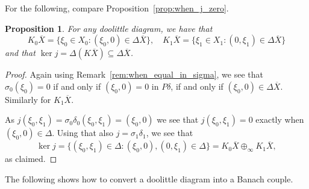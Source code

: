 \documentclass[a4paper,11pt]{article}
\theoremstyle{plain}
\newtheorem{proposition}{Proposition}[section]
\theoremstyle{remark}
\begin{document}
For the following, compare Proposition~\ref{prop:when_j_zero}.

\begin{proposition}\label{prop:Ki_and_j}
For any doolittle diagram, we have that
\[ K_0\overline X = \{ \xi_0\in X_0 : (\xi_0,0) \in \Delta\overline X \}, \quad
K_1\overline X = \{ \xi_1\in X_1 : (0,\xi_1) \in \Delta\overline X \} \]
and that $\ker j = \Delta(K\overline X) \subseteq \Delta\overline X$.
\end{proposition}
\begin{proof}
Again using Remark~\ref{rem:when_equal_in_sigma}, we see that $\sigma_0(\xi_0)=0$ if and only if $(\xi_0,0)=0$ in $P\delta$, if and only if $(\xi_0,0) \in \Delta\overline X$.  Similarly for $K_1\overline X$.

As $j(\xi_0,\xi_1) = \sigma_0\delta_0(\xi_0,\xi_1) = (\xi_0,0)$ we see that $j(\xi_0,\xi_1) = 0$ exactly when $(\xi_0,0) \in \Delta$.  Using that also $j=\sigma_1\delta_1$, we see that
\[ \ker j = \{ (\xi_0,\xi_1)\in \Delta : (\xi_0,0), (0,\xi_1) \in \Delta \}
= K_0\overline X \oplus_\infty K_1\overline X, \]
as claimed.
\end{proof}

The following shows how to convert a doolittle diagram into a Banach couple.
\end{document}
